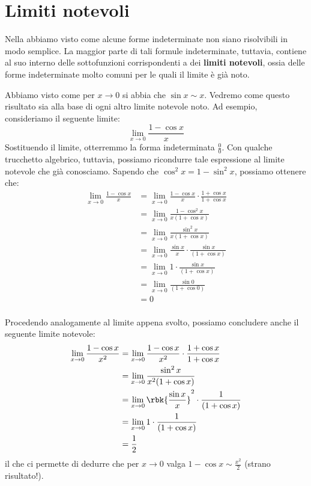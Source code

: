 \documentclass[a4paper, 12pt]{report}
\begin{document}
    \newpage

    \section{Limiti notevoli}

    Nella  abbiamo visto come alcune forme indeterminate non siano risolvibili in modo semplice. La maggior parte di tali formule indeterminate, tuttavia, contiene al suo interno delle sottofunzioni corrispondenti a dei \textbf{limiti notevoli}, ossia delle forme indeterminate molto comuni per le quali il limite è già noto.

    Abbiamo visto come per $x \to 0$ si abbia che $\sin x \sim x$. Vedremo come questo risultato sia alla base di ogni altro limite notevole noto. Ad esempio, consideriamo il seguente limite:
    \[\lim_{x \to 0} \frac{1-\cos x}{x}\]
    Sostituendo il limite, otterremmo la forma indeterminata $\frac{0}{0}$. Con qualche trucchetto algebrico, tuttavia, possiamo ricondurre tale espressione al limite notevole che già conosciamo. Sapendo che $\cos^2 x = 1 - \sin^2 x$, possiamo ottenere che:
    \[\begin{split}
        \lim_{x \to 0} \frac{1-\cos x}{x} &= \lim_{x \to 0} \frac{1 - \cos x}{x} \cdot \frac{1 + \cos x}{1 + \cos x} \\
        &= \lim_{x \to 0} \frac{1 - \cos^2 x}{x (1 + \cos x)}\\
        &= \lim_{x \to 0} \frac{\sin^2 x}{x (1 + \cos x)}\\
        &= \lim_{x \to 0} \frac{\sin x}{x} \cdot \frac{\sin x}{(1 + \cos x)}\\
        &= \lim_{x \to 0} 1 \cdot \frac{\sin x}{(1 + \cos x)}\\
        &= \lim_{x \to 0} \frac{\sin 0}{(1 + \cos 0)}\\
        &= 0\\
    \end{split}\]
    
    Procedendo analogamente al limite appena svolto, possiamo concludere anche il seguente limite notevole:
    \[\begin{split}
        \lim_{x \to 0} \frac{1-\cos x}{x^2} &= \lim_{x \to 0} \frac{1 - \cos x}{x^2} \cdot \frac{1 + \cos x}{1 + \cos x} \\
        &= \lim_{x \to 0} \frac{\sin^2 x}{x^2 (1 + \cos x)}\\
        &= \lim_{x \to 0} \rbk{\frac{\sin x}{x}}^2 \cdot \frac{1}{(1 + \cos x)}\\
        &= \lim_{x \to 0} 1 \cdot \frac{1}{(1 + \cos x)}\\
        &= \frac{1}{2}\\
    \end{split}\]
    il che ci permette di dedurre che per $x \to 0$ valga $1-\cos x \sim \frac{x^2}{2}$ (strano risultato!).
\end{document}
